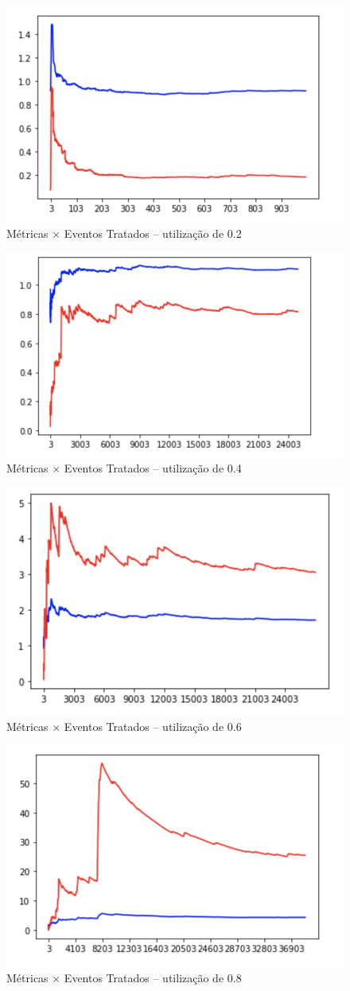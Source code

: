 \documentclass[a4paper]{article}
\begin{document}
\begin{figure}[h!]
    \centering
    \includegraphics[width=.6\textwidth]{imagens/utilizacao2.png}
    \caption{Métricas \(\times\) Eventos Tratados --
        utilização de 0.2}
\end{figure}

\begin{figure}[h!]
    \centering
    \includegraphics[width=.6\textwidth]{imagens/utilizacao4.png}
    \caption{Métricas \(\times\) Eventos Tratados --
        utilização de 0.4}
\end{figure}

\begin{figure}[h!]
    \centering
    \includegraphics[width=.6\textwidth]{imagens/utilizacao6.png}
    \caption{Métricas \(\times\) Eventos Tratados --
        utilização de 0.6}
\end{figure}

\begin{figure}[h!]
    \centering
    \includegraphics[width=.6\textwidth]{imagens/utilizacao8.png}
    \caption{Métricas \(\times\) Eventos Tratados --
        utilização de 0.8}
\end{figure}
\end{document}
